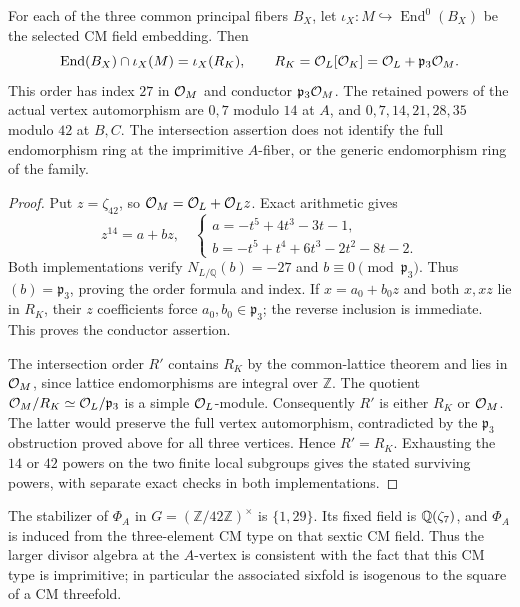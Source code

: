 \begin{proposition}\label{prop:survivingorder}
For each of the three common principal fibers $B_X$, let
$\iota_X:M\hookrightarrow\operatorname{End}^0(B_X)$ be the selected CM
field embedding. Then
\[
 \operatorname{End}(B_X)\cap\iota_X(M)
 =\iota_X(R_K),\qquad
 R_K=\mathcal O_L[\mathcal O_K]=\mathcal O_L+\mathfrak p_3\mathcal O_M.
\]
This order has index $27$ in $\mathcal O_M$ and conductor $\mathfrak p_3\mathcal O_M$.
The retained powers of the actual vertex automorphism are $0,7$ modulo
$14$ at $A$, and $0,7,14,21,28,35$ modulo $42$ at $B,C$.
The intersection assertion does not identify the full endomorphism
ring at the imprimitive $A$-fiber, or the generic endomorphism ring
of the family.
\end{proposition}
\begin{proof}
Put $z=\zeta_{42}$, so $\mathcal O_M=\mathcal O_L+\mathcal O_L z$. Exact arithmetic gives
\[
 z^{14}=a+bz,\quad
 \begin{cases}
 a=-t^5+4t^3-3t-1,\\
 b=-t^5+t^4+6t^3-2t^2-8t-2.
 \end{cases}
\]
Both implementations verify $N_{L/\mathbb Q}(b)=-27$ and
$b\equiv0\pmod{\mathfrak p_3}$. Thus $(b)=\mathfrak p_3$, proving the
order formula and index. If $x=a_0+b_0z$ and both $x,xz$ lie in $R_K$,
their $z$ coefficients force $a_0,b_0\in\mathfrak p_3$; the reverse
inclusion is immediate. This proves the conductor assertion.

The intersection order $R'$ contains $R_K$ by the common-lattice theorem
and lies in $\mathcal O_M$, since lattice endomorphisms are integral over $\mathbb Z$.
The quotient $\mathcal O_M/R_K\simeq\mathcal O_L/\mathfrak p_3$ is a simple $\mathcal O_L$-module.
Consequently $R'$ is either $R_K$ or $\mathcal O_M$. The latter would preserve the
full vertex automorphism, contradicted by the $\mathfrak p_3$ obstruction
proved above for all three vertices. Hence $R'=R_K$. Exhausting the
$14$ or $42$ powers on the two finite local subgroups gives the stated
surviving powers, with separate exact checks in both implementations.
\end{proof}

\begin{remark}
The stabilizer of $\Phi_A$ in $G=(\mathbb Z/42\mathbb Z)^\times$ is $\{1,29\}$.  Its fixed field is $\mathbb Q(\zeta_7)$, and $\Phi_A$ is induced from the three-element CM type on that sextic CM field.  Thus the larger divisor algebra at the $A$-vertex is consistent with the fact that this CM type is imprimitive; in particular the associated sixfold is isogenous to the square of a CM threefold.
\end{remark}

